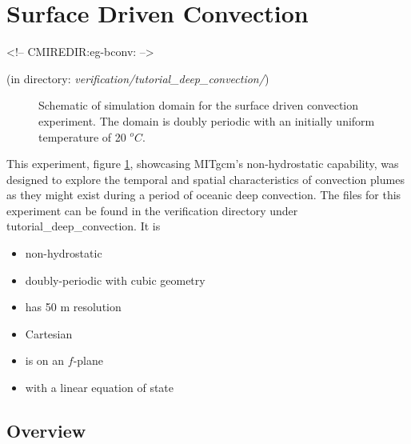 \section{Surface Driven Convection}
\label{www:tutorials}
\label{sect:eg-bconv}
\begin{rawhtml}
<!-- CMIREDIR:eg-bconv: -->
\end{rawhtml}
\begin{center}
(in directory: {\it verification/tutorial\_deep\_convection/})
\end{center}


%
%

\begin{figure}
\begin{center}
\end{center}
\caption{Schematic of simulation domain 
for the surface driven convection experiment. The domain is doubly periodic
with an initially uniform temperature of 20 $^oC$. 
}
\label{FIG:eg-bconv-simulation_config}
\end{figure}

This experiment, figure \ref{FIG:eg-bconv-simulation_config}, showcasing MITgcm's non-hydrostatic 
capability, was designed to explore 
the temporal and spatial characteristics of convection plumes as they might exist during a 
period of oceanic deep convection. The files for this experiment can be found in the verification
directory under tutorial\_deep\_convection. It is

\begin{itemize}
\item non-hydrostatic 
\item doubly-periodic with cubic geometry
\item has 50 m resolution 
\item Cartesian  
\item is on an $f$-plane 
\item with a linear equation of state 
\end{itemize}

\subsection{Overview}
\label{www:tutorials}

